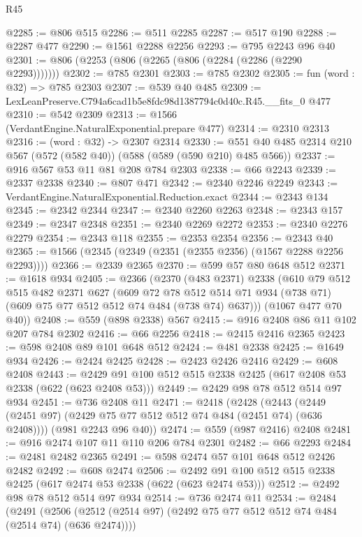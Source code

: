 \begin{lexlean}{R45}
\begin{coremodule}
@2285 := @806 @515
@2286 := @511 @2285
@2287 := @517 @190
@2288 := @2287 @477
@2290 := @1561 @2288 @2256
@2293 := @795 @2243 @96 @40
@2301 := @806 (@2253 (@806 (@2265 (@806 (@2284 (@2286 (@2290 @2293)))))))
@2302 := @785 @2301
@2303 := @785 @2302
@2305 := fun (word : @32) => @785 @2303
@2307 := @539 @40 @485
@2309 := LexLeanPreserve.C794a6cad1b5e8fdc98d1387794c0d40c.R45.__fits_0 @477
@2310 := @542 @2309
@2313 := @1566 (VerdantEngine.NaturalExponential.prepare @477)
@2314 := @2310 @2313
@2316 := (word : @32) -> @2307 @2314
@2330 := @551 @40 @485 @2314 @210 @567 (@572 (@582 @40)) (@588 (@589 (@590 @210) @485 @566))
@2337 := @916 @567 @53 @11 @81 @208 @784 @2303
@2338 := @66 @2243
@2339 := @2337 @2338
@2340 := @807 @471
@2342 := @2340 @2246 @2249
@2343 := VerdantEngine.NaturalExponential.Reduction.exact
@2344 := @2343 @134
@2345 := @2342 @2344
@2347 := @2340 @2260 @2263
@2348 := @2343 @157
@2349 := @2347 @2348
@2351 := @2340 @2269 @2272
@2353 := @2340 @2276 @2279
@2354 := @2343 @118
@2355 := @2353 @2354
@2356 := @2343 @40
@2365 := @1566 (@2345 (@2349 (@2351 (@2355 @2356) (@1567 @2288 @2256 @2293))))
@2366 := @2339 @2365
@2370 := @599 @57 @80 @648 @512
@2371 := @1618 @934
@2405 := @2366
    (@2370
      (@483 @2371)
      @2338
      (@610
        @79
        @512
        @515
        @482
        @2371
        @627
        (@609
          @72
          @78
          @512
          @514
          @71
          @934
          (@738 @71)
          (@609 @75 @77 @512 @512 @74 @484 (@738 @74) @637)))
      (@1067 @477 @70 @40))
@2408 := @559 (@898 @2338) @567
@2415 := @916 @2408 @86 @11 @102 @207 @784 @2302
@2416 := @66 @2256
@2418 := @2415 @2416 @2365
@2423 := @598 @2408 @89 @101 @648 @512
@2424 := @481 @2338
@2425 := @1649 @934
@2426 := @2424 @2425
@2428 := @2423 @2426 @2416
@2429 := @608 @2408
@2443 := @2429 @91 @100 @512 @515 @2338 @2425 (@617 @2408 @53 @2338 (@622 (@623 @2408 @53)))
@2449 := @2429 @98 @78 @512 @514 @97 @934
@2451 := @736 @2408 @11
@2471 := @2418
    (@2428
      (@2443 (@2449 (@2451 @97) (@2429 @75 @77 @512 @512 @74 @484 (@2451 @74) (@636 @2408))))
      (@981 @2243 @96 @40))
@2474 := @559 (@987 @2416) @2408
@2481 := @916 @2474 @107 @11 @110 @206 @784 @2301
@2482 := @66 @2293
@2484 := @2481 @2482 @2365
@2491 := @598 @2474 @57 @101 @648 @512 @2426 @2482
@2492 := @608 @2474
@2506 := @2492 @91 @100 @512 @515 @2338 @2425 (@617 @2474 @53 @2338 (@622 (@623 @2474 @53)))
@2512 := @2492 @98 @78 @512 @514 @97 @934
@2514 := @736 @2474 @11
@2534 := @2484
    (@2491
      (@2506 (@2512 (@2514 @97) (@2492 @75 @77 @512 @512 @74 @484 (@2514 @74) (@636 @2474))))

\end{coremodule}
\end{lexlean}
